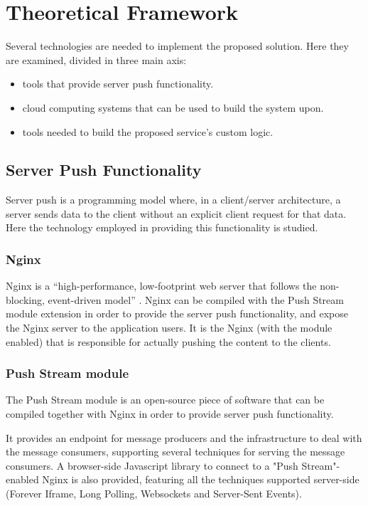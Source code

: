 \section{Theoretical Framework} \label{section-theoretical-framework}

Several technologies are needed to implement the proposed solution. Here they are examined, divided in three main axis:
\begin{itemize}
    \item tools that provide server push functionality.
    \item cloud computing systems that can be used to build the system upon.
    \item tools needed to build the proposed service's custom logic.
\end{itemize}

\subsection{Server Push Functionality}

Server push is a programming model where, in a client/server architecture, a server sends data to the client without an explicit client request for that data. Here the technology employed in providing this functionality is studied.

\subsubsection{Nginx}

Nginx is a ``high-performance, low-footprint web server that follows the non-blocking, event-driven model'' \cite{marinos2014network}. Nginx can be compiled with the Push Stream module extension in order to provide the server push functionality, and expose the Nginx server to the application users. It is the Nginx (with the module enabled) that is responsible for actually pushing the content to the clients.

\subsubsection{Push Stream module}

The Push Stream module is an open-source piece of software that can be compiled together with Nginx in order to provide server push functionality.

It provides an endpoint for message producers and the infrastructure to deal with the message consumers, supporting several techniques for serving the message consumers. A browser-side Javascript library to connect to a "Push Stream"-enabled Nginx is also provided, featuring all the techniques supported server-side (Forever Iframe, Long Polling, Websockets and Server-Sent Events).

